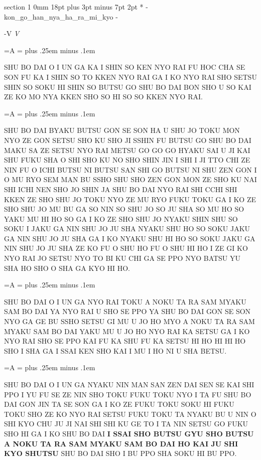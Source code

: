 \documentclass[12pt]{article}
\makeatletter
\renewcommand{\section}{\@startsection%
 {section}			%
 {1}				%
 {0mm}				%
 {18pt plus 3pt minus 7pt}	%
 { 2pt}				%
 {\bfseries}}			%
\newcounter{labelnum}
\newenvironment{Prayer}[4]{%
	\section*{#2}
	\ifx -#1
		\stepcounter{labelnum}\label{label.\arabic{labelnum}}\nopagebreak
	\else
		\label{#1}\nopagebreak
	\fi
	\ifx -#3
		\addcontentsline{toc}{section}{#2}
	\else
		\addcontentsline{toc}{section}{#3}
	\fi
	\ifx -#4
		{}
	\else
		\noindent\emph{#4}\par\nopagebreak
	\fi
	\begingroup
}
{\par\endgroup}
\newcommand{\wersaliki}{%
	\newbox\Abox
	\newdimen\Aspacja
	\setbox\Abox=\hbox{A}
	\Aspacja=\wd\Abox
	\spaceskip \Aspacja plus .25em minus .1em
}
\newenvironment{JAPANESE}
{
	\parindent	0pt
	\parfillskip	0pt
	\language 255
	\begingroup
	\wersaliki
	\par
}
{\par\endgroup}
\makeatother
\begin{document}
\begin{Prayer}{kon_go_han_nya_ha_ra_mi_kyo}
\newpage
\Stanzanum{V}
\begin{JAPANESE}
SHU BO DAI O I UN GA KA I SHIN SO KEN NYO RAI FU HOC CHA SE SON FU KA I SHIN SO
TO KKEN NYO RAI GA I KO NYO RAI SHO SETSU SHIN SO SOKU HI SHIN SO BUTSU GO SHU
BO DAI BON SHO U SO KAI ZE KO MO NYA KKEN SHO SO HI SO SO KKEN NYO RAI.
\end{JAPANESE}

\begin{JAPANESE}
SHU BO DAI BYAKU BUTSU GON SE SON HA U SHU JO TOKU MON NYO ZE GON SETSU SHO KU
SHO JI SSHIN FU BUTSU GO SHU BO DAI MAKU SA ZE SETSU NYO RAI METSU GO GO GO
HYAKU SAI U JI KAI SHU FUKU SHA O SHI SHO KU NO SHO SHIN JIN I SHI I JI TTO CHI
ZE NIN FU O ICHI BUTSU NI BUTSU SAN SHI GO BUTSU NI SHU ZEN GON I O MU RYO SEM
MAN BU SSHO SHU SHO ZEN GON MON ZE SHO KU NAI SHI ICHI NEN SHO JO SHIN JA SHU
BO DAI NYO RAI SHI CCHI SHI KKEN ZE SHO SHU JO TOKU NYO ZE MU RYO FUKU TOKU GA
I KO ZE SHO SHU JO MU BU GA SO NIN SO SHU JO SO JU SHA SO MU HO SO YAKU MU HI
HO SO GA I KO ZE SHO SHU JO NYAKU SHIN SHU SO SOKU I JAKU GA NIN SHU JO JU SHA
NYAKU SHU HO SO SOKU JAKU GA NIN SHU JO JU SHA GA I KO NYAKU SHU HI HO SO SOKU
JAKU GA NIN SHU JO JU SHA ZE KO FU O SHU HO FU O SHU HI HO I ZE GI KO NYO RAI
JO SETSU NYO TO BI KU CHI GA SE PPO NYO BATSU YU SHA HO SHO O SHA GA KYO HI HO.
\end{JAPANESE}

\begin{JAPANESE}
SHU BO DAI O I UN GA NYO RAI TOKU A NOKU TA RA SAM MYAKU SAM BO DAI YA NYO RAI
U SHO SE PPO YA SHU BO DAI GON SE SON NYO GA GE BU SSHO SETSU GI MU U JO HO MYO
A NOKU TA RA SAM MYAKU SAM BO DAI YAKU MU U JO HO NYO RAI KA SETSU GA I KO NYO
RAI SHO SE PPO KAI FU KA SHU FU KA SETSU HI HO HI HI HO SHO I SHA GA I SSAI KEN
SHO KAI I MU I HO NI U SHA BETSU.
\end{JAPANESE}

\begin{JAPANESE}
SHU BO DAI O I UN GA NYAKU NIN MAN SAN ZEN DAI SEN SE KAI SHI PPO I YU FU SE ZE
NIN SHO TOKU FUKU TOKU NYO I TA FU SHU BO DAI GON JIN TA SE SON GA I KO ZE FUKU
TOKU SOKU HI FUKU TOKU SHO ZE KO NYO RAI SETSU FUKU TOKU TA NYAKU BU U NIN O
SHI KYO CHU JU JI NAI SHI SHI KU GE TO I TA NIN SETSU GO FUKU SHO HI GA I KO
SHU BO DAI {\bf I SSAI SHO BUTSU GYU SHO BUTSU A NOKU TA RA SAM MYAKU SAM BO
DAI HO KAI JU SHI KYO SHUTSU} SHU BO DAI SHO I BU PPO SHA SOKU HI BU PPO.
\end{JAPANESE}


\end{Prayer}
\end{document}
